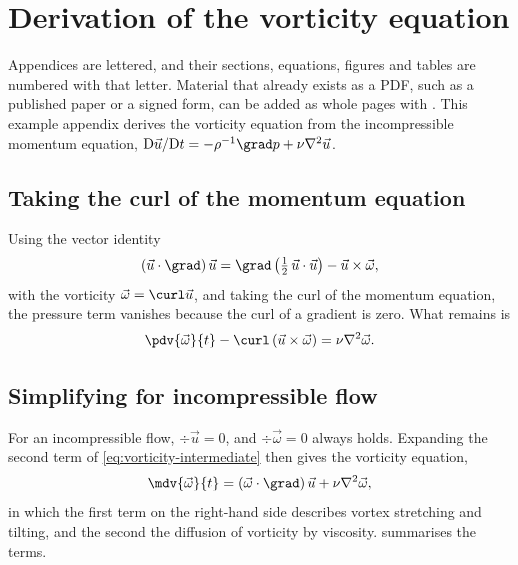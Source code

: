 \chapter[Derivation of the vorticity equation][Vorticity equation]{Derivation of the vorticity equation}\label{app:derivation} \pagestyle{appendix}
\chapterprecishere{}
\chapterprecistoc{}

Appendices are lettered, and their sections, equations, figures and tables are numbered with that letter. Material that already exists as a PDF, such as a published paper or a signed form, can be added as whole pages with \verb||. This example appendix derives the vorticity equation from the incompressible momentum equation, $\mathrm{D}\vec{u}/\mathrm{D}t = -\rho^{-1} \grad p + \nu \nabla^2 \vec{u}$.

\section{Taking the curl of the momentum equation}\label{app:sec:curl}

Using the vector identity
\begin{equation}
    \left( \vec{u} \cdot \grad \right) \vec{u} = \grad \left( \tfrac{1}{2} \, \vec{u} \cdot \vec{u} \right) - \vec{u} \times \vec{\omega},
    \label{eq:identity}
\end{equation}
with the vorticity $\vec{\omega} = \curl \vec{u}$, and taking the curl of the momentum equation, the pressure term vanishes because the curl of a gradient is zero. What remains is
\begin{equation}
    \pdv{\vec{\omega}}{t} - \curl \left( \vec{u} \times \vec{\omega} \right) = \nu \nabla^2 \vec{\omega}.
    \label{eq:vorticity-intermediate}
\end{equation}

\section{Simplifying for incompressible flow}\label{app:sec:simplify}

For an incompressible flow, $\div \vec{u} = 0$, and $\div \vec{\omega} = 0$ always holds. Expanding the second term of \cref{eq:vorticity-intermediate} then gives the vorticity equation,
\begin{equation}
    \mdv{\vec{\omega}}{t} = \left( \vec{\omega} \cdot \grad \right) \vec{u} + \nu \nabla^2 \vec{\omega},
    \label{eq:vorticity}
\end{equation}
in which the first term on the right-hand side describes vortex stretching and tilting, and the second the diffusion of vorticity by viscosity.  summarises the terms.

